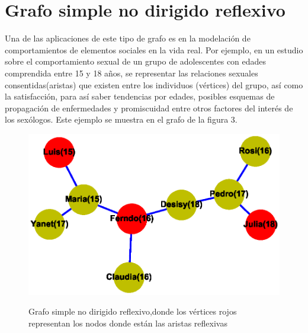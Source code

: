 \documentclass{article}
\begin{document}
\section{Grafo simple no dirigido reflexivo}
Una de las aplicaciones de este tipo de grafo es en la modelación de comportamientos de elementos sociales en la vida real.
Por ejemplo, en un estudio sobre el comportamiento sexual de un grupo de adolescentes con edades comprendida entre 15 y 18 años, se representar las relaciones sexuales consentidas(aristas) que existen entre los individuos (vértices) del grupo, así como la satisfacción, para así saber tendencias por edades, posibles esquemas de propagación de enfermedades y promiscuidad entre otros factores del interés de los sexólogos. Este ejemplo se muestra en el grafo de la figura 3.  
  
\begin{center}

\end{center}
\begin{figure}[h]
\begin{center}
\includegraphics[scale=0.7]{Graf3.eps}\\
\caption{Grafo simple no dirigido reflexivo,donde los vértices rojos representan los nodos donde están las aristas reflexivas}
\end{center}
\end{figure}
\end{document}
